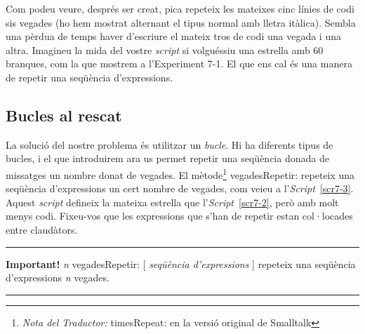 Com podeu veure, després ser creat, \textsf{pica} repeteix les mateixes cinc línies de codi sis vegades (ho hem mostrat alternant el tipus normal amb lletra itàlica). Sembla una pèrdua de temps haver d'escriure el mateix tros de codi una vegada i una altra. Imagineu la mida del vostre \emph{script} si volguéssiu una estrella amb 60 branques, com la que mostrem a l'Experiment 7-1. El que ens cal és una manera de repetir una seqüència d'expressions.

\subsection{Bucles al rescat}
La solució del nostre problema és utilitzar un \emph{bucle}. Hi ha diferents tipus de bucles, i el que introduirem ara us permet repetir una seqüència donada de missatges un nombre donat de vegades. El mètode\footnote{\emph{Nota del Traductor:} \textsf{timesRepeat:} en la versió original de Smalltalk} \textsf{vegadesRepetir:} repeteix una seqüència d'expressions un cert nombre de vegades, com veieu a l'\emph{Script}~\ref{scr7-3}. Aquest \emph{script} defineix la mateixa estrella que l'\emph{Script}~\ref{scr7-2}, però amb molt menys codi. Fixeu-vos que les expressions que s'han de repetir estan col·locades entre claudàtors. 

\noindent
\rule{\textwidth}{2pt}
\noindent
\textbf{Important!} \textsf{{\itshape n} vegadesRepetir: [ {\itshape seqüència d'expressions} ]} repeteix una seqüència d'expressions \textsf{{\itshape n}} vegades.\\
\noindent
\rule{\textwidth}{2pt}
\vspace{3mm}

